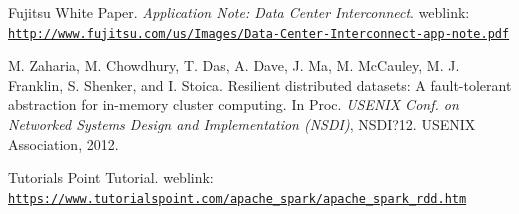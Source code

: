 \documentclass[10pt,conference,letterpaper]{IEEEtran}
\begin{document}
\begin{thebibliography}{1}
Fujitsu White Paper. \textit{Application Note: Data Center Interconnect}.
weblink: \texttt{\url{http://www.fujitsu.com/us/Images/Data-Center-Interconnect-app-note.pdf}}

M. Zaharia, M. Chowdhury, T. Das, A. Dave, J. Ma,
M. McCauley, M. J. Franklin, S. Shenker, and I. Stoica. Resilient distributed datasets: A fault-tolerant abstraction for in-memory cluster computing. In Proc. \textit{USENIX Conf. on Networked Systems Design and Implementation (NSDI)}, NSDI?12. USENIX Association, 2012.

Tutorials Point Tutorial. weblink: \texttt{\url{https://www.tutorialspoint.com/apache_spark/apache_spark_rdd.htm}}
\end{thebibliography}
\end{document}
